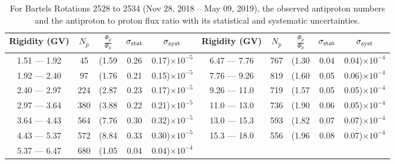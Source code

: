 \begin{table}[p] 
\renewcommand\baselinestretch{1.3}\selectfont
\setlength\tabcolsep{3pt}
\centering
\begin{tabular}{ccccc | ccccc}
\hline
\textbf{Rigidity}  (GV)  & $N_{\bar{p}}$ & $\frac{\Phi_{\bar{p}}}{\Phi_{p}}$ & $\sigma_{\rm{stat}}$ & $\sigma_{\rm{syst}}$ \hspace{1cm}   & \textbf{Rigidity}  (GV)  & $N_{\bar{p}}$ & $\frac{\Phi_{\bar{p}}}{\Phi_{p}}$ & $\sigma_{\rm{stat}}$ & $\sigma_{\rm{syst}}$ \hspace{1cm} \\ 
\hline
1.51 — 1.92   &  45                  &(1.59                          &  0.26              &      0.17)$\times 10^{-5}$  & 6.47 — 7.76                &  767                    &(1.30                                &  0.04                   &      0.04)$\times 10^{-4}$\\
1.92 — 2.40   &  97                  &(1.76                          &  0.21              &      0.15)$\times 10^{-5}$  &7.76 — 9.26                &  819                    &(1.60                                &  0.05                   &      0.06)$\times 10^{-4}$\\
2.40 — 2.97   &  224                &(2.87                          &  0.23              &      0.17)$\times 10^{-5}$  & 9.26 — 11.0                &  719                    &(1.57                                &  0.05                   &      0.05)$\times 10^{-4}$\\    
2.97 — 3.64   &  380                &(3.88                          &  0.22              &      0.21)$\times 10^{-5}$  & 11.0 — 13.0                 &  736                    &(1.90                                &  0.06                   &      0.05)$\times 10^{-4}$\\    
3.64 — 4.43   &  564                &(7.76                          &  0.30              &      0.32)$\times 10^{-5}$  & 13.0 — 15.3               &  593                    &(1.82                                &  0.07                   &      0.07)$\times 10^{-4}$\\
4.43 — 5.37   &  572                &(8.84                          &  0.33              &      0.30)$\times 10^{-5}$  & 15.3 — 18.0               &  556                    &(1.96                                &  0.08                   &      0.07)$\times 10^{-4}$\\
5.37 — 6.47   &  680                &(1.05                          &  0.04              &      0.04)$\times 10^{-4}$  & \\
\hline
\end{tabular}
\caption[Antiproton to proton flux ratio for Bartels Rotations 2528 to 2534]{For Bartels Rotations 2528 to 2534 (Nov 28, 2018 – May 09, 2019), the observed antiproton numbers and the antiproton to proton flux ratio with its statistical and systematic uncertainties.}
\label{TableOfDependent18}
\end{table}

